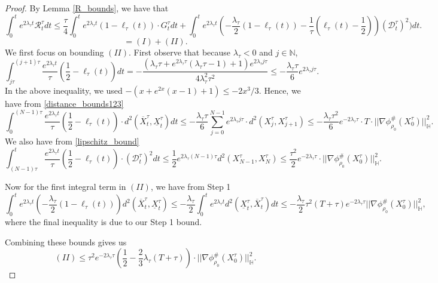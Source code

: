 \documentclass[10pt,a4paper]{amsart}
\newcommand{\N}{\mathbb{N}}
\begin{document}
\begin{proof}
By Lemma \ref{R_bounds}, we have that
\[ \int_0^t e^{2 \lambda_{\tau} t} \mathcal{R}^{\tau}_t dt \leq \frac{\tau}{4}\int_0^t e^{2 \lambda_{\tau} t}  (1-\ell_{\tau}(t)) \cdot G^{\tau}_t dt + \int_0^t e^{2 \lambda_{\tau} t}\left( -\frac{\lambda_{\tau}}{2}  (1-\ell_{\tau}(t)) - \frac{1}{\tau}(\ell_{\tau}(t)-\frac{1}{2}) \right)  (\mathcal{D}_{t}^{\tau})^2) dt.  \]
\[ = (I) + (II). \] We first focus on bounding $(II)$. First observe that because $\lambda_{\tau} < 0$ and $j \in \N$,
\[ \int_{j \tau}^{(j+1)\tau}  \frac{e^{2 \lambda_{\tau} t}}{\tau}(\frac{1}{2}-\ell_{\tau}(t)) dt = - \frac{ (\lambda_{\tau} \tau + e^{2 \lambda_{\tau} \tau}(\lambda_{\tau} \tau - 1) + 1)e^{2 \lambda_{\tau} j \tau} }{4\lambda_{\tau}^2 \tau^2} \leq -\frac{\lambda_{\tau} \tau}{6} e^{2 \lambda_{\tau} j \tau}.  \]  In the above inequality, we used $-(x+e^{2x}(x-1)+1) \leq -2x^3/3$. Hence, we have from \eqref{distance_bounds123}
\[ \int_0^{(N-1)\tau}  \frac{e^{2 \lambda_{\tau} t}}{\tau} (\frac{1}{2} - \ell_{\tau}(t)) \cdot d^2(\overline{X}^{\tau}_t,\underline{X}_t^{\tau}) dt \leq -\frac{\lambda_{\tau} \tau}{6} \sum_{j=0}^{N-1} e^{2 \lambda_{\tau} j \tau} \cdot d^2(X^{\tau}_j,X^{\tau}_{j+1}) \leq -\frac{\lambda_{\tau} \tau^2 }{6}   e^{-2 \lambda_{\tau} \tau} \cdot T \cdot ||\nabla \phi^{\#}_{\rho_0}(X^{\tau}_0)||^2_{\mathbb{H}}. \] We also have from \eqref{lipschitz_bound}
\[ \int_{(N-1) \tau}^t \frac{e^{2 \lambda_{\tau} t}}{\tau} (\frac{1}{2} - \ell_{\tau}(t)) \cdot (\mathcal{D}_t^{\tau})^2 dt \leq \frac{1}{2}  e^{2 \lambda_{\tau}(N-1) \tau}d^2(X^{\tau}_{N-1},X^{\tau}_{N}) \leq  \frac{\tau^2}{2} e^{-2 \lambda_{\tau} \tau} \cdot ||\nabla \phi^{\#}_{\rho_0}(X_0^{\tau})||^2_{\mathbb{H}} .     \]


Now for the first integral term in $(II)$, we have from Step 1
\[ \int_0^t e^{2\lambda_{\tau} t} \left( -\frac{\lambda_{\tau}}{2}(1-\ell_{\tau}(t)) \right) d^2(\overline{X}_{t}^{\tau},\underline{X}_t^{\tau}) \leq -\frac{\lambda_{\tau}}{2} \int_0^t e^{2\lambda_{\tau} t} d^2(\underline{X}_t^{\tau},\overline{X}^{\tau}_t) dt \leq -\frac{\lambda_{\tau}}{2} \tau^2(T+\tau)e^{-2 \lambda_{\tau} \tau} ||\nabla \phi^{\#}_{\rho_0}(X_0^{\tau})||^2_{\mathbb{H}}, \] where the final inequality is due to our Step 1 bound. \smallskip

Combining these bounds gives us
\[ (II) \leq  \tau^2e^{-2\lambda_{\tau} \tau} \left( \frac{1}{2} -  \frac{2}{3} \lambda_{\tau}(T+\tau)   \right) \cdot||\nabla \phi^{\#}_{\rho_0}(X^{\tau}_0)||^2_{\mathbb{H}}. \] 


\end{proof}
\end{document}
